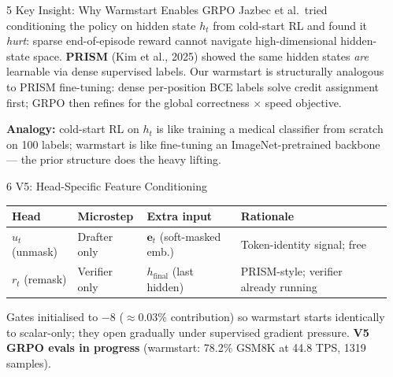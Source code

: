 \documentclass[final]{beamer}
\newlength{\colsep}   \setlength{\colsep}{0.7cm}
\newlength{\colwidth} \setlength{\colwidth}{0.306\paperwidth}
\begin{document}
\begin{frame}[t]
\begin{columns}[t]
\begin{column}{\colwidth}
\begin{block}{5 \quad Key Insight: Why Warmstart Enables GRPO}
\medskip
Jazbec et al.\ tried conditioning the policy on hidden state $h_t$ from
cold-start RL and found it \emph{hurt}: sparse end-of-episode reward
cannot navigate high-dimensional hidden-state space.
\textbf{PRISM} (Kim et al., 2025) showed the same hidden states
\emph{are} learnable via dense supervised labels.
Our warmstart is structurally analogous to PRISM fine-tuning: dense
per-position BCE labels solve credit assignment first; GRPO then
refines for the global correctness$\,{\times}\,$speed objective.

\medskip\noindent
\textbf{Analogy:} cold-start RL on $h_t$ is like training a medical
classifier from scratch on 100 labels; warmstart is like fine-tuning
an ImageNet-pretrained backbone — the prior structure does the heavy lifting.
\end{block}

\begin{block}{6 \quad V5: Head-Specific Feature Conditioning}

\begin{center}
\setlength{\tabcolsep}{6pt}
\renewcommand{\arraystretch}{1.3}
\begin{tabular}{llll}
\toprule
\textbf{Head} & \textbf{Microstep} & \textbf{Extra input} & \textbf{Rationale} \\
\midrule
$u_t$ (unmask) & Drafter only  & $\mathbf{e}_t$ (soft-masked emb.) & Token-identity signal; free \\
$r_t$ (remask) & Verifier only & $h_{\mathrm{final}}$ (last hidden) & PRISM-style; verifier already running \\
\bottomrule
\end{tabular}
\end{center}

\medskip
Gates initialised to $-8$ (${\approx}0.03\%$ contribution) so warmstart
starts identically to scalar-only; they open gradually under supervised
gradient pressure.
\textbf{V5 GRPO evals in progress} (warmstart: 78.2\% GSM8K at 44.8 TPS,
1319 samples).
\end{block}

\end{column}

\hspace{\colsep}
\begin{column}{\colwidth}


\end{column}
\end{columns}
\end{frame}
\end{document}
